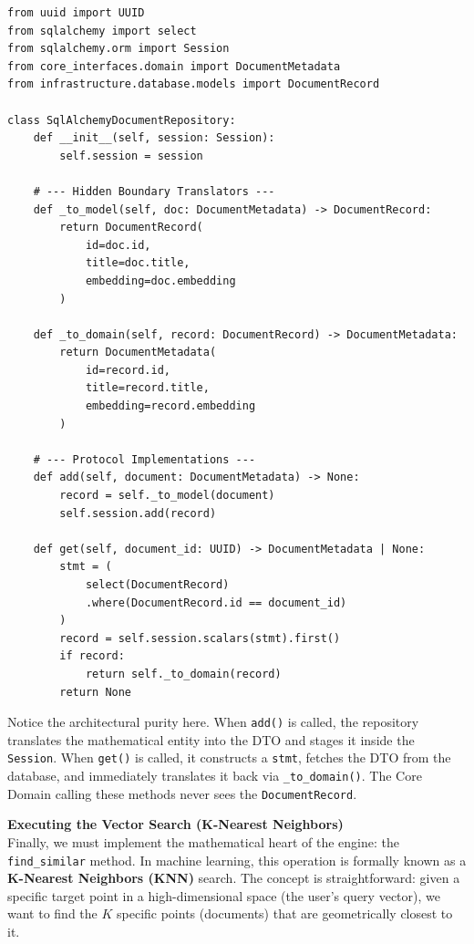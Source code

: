 \begin{lstlisting}[caption={The Repository Adapter: Translation and Basic CRUD}]
from uuid import UUID
from sqlalchemy import select
from sqlalchemy.orm import Session
from core_interfaces.domain import DocumentMetadata
from infrastructure.database.models import DocumentRecord

class SqlAlchemyDocumentRepository:
    def __init__(self, session: Session):
        self.session = session

    # --- Hidden Boundary Translators ---
    def _to_model(self, doc: DocumentMetadata) -> DocumentRecord:
        return DocumentRecord(
            id=doc.id,
            title=doc.title,
            embedding=doc.embedding
        )

    def _to_domain(self, record: DocumentRecord) -> DocumentMetadata:
        return DocumentMetadata(
            id=record.id,
            title=record.title,
            embedding=record.embedding
        )

    # --- Protocol Implementations ---
    def add(self, document: DocumentMetadata) -> None:
        record = self._to_model(document)
        self.session.add(record)

    def get(self, document_id: UUID) -> DocumentMetadata | None:
        stmt = (
            select(DocumentRecord)
            .where(DocumentRecord.id == document_id)
        )
        record = self.session.scalars(stmt).first()
        if record:
            return self._to_domain(record)
        return None
\end{lstlisting}

Notice the architectural purity here. When \texttt{add()} is called, the repository translates the mathematical entity into the DTO and stages it inside the \texttt{Session}. When \texttt{get()} is called, it constructs a \texttt{stmt}, fetches the DTO from the database, and immediately translates it back via \texttt{\_to\_domain()}. The Core Domain calling these methods never sees the \texttt{DocumentRecord}.

\textbf{Executing the Vector Search (K-Nearest Neighbors)} \\
Finally, we must implement the mathematical heart of the engine: the \texttt{find\_similar} method. In machine learning, this operation is formally known as a \textbf{K-Nearest Neighbors (KNN)} search. The concept is straightforward: given a specific target point in a high-dimensional space (the user's query vector), we want to find the $K$ specific points (documents) that are geometrically closest to it.


